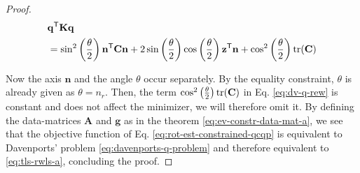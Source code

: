 \begin{proof}
	\begin{equation}
		\label{eq:dv-q-rew}
		\begin{aligned}
			&\mathbf{q}^{\mathsf{T}} \mathbf{K} \mathbf{q}\\
			&= \sin^2 \left(\frac{\theta}{2} \right) \mathbf{n}^{\mathsf{T}} \mathbf{C} \mathbf{n} + 2 \sin \left(\frac{\theta}{2} \right) \cos \left(\frac{\theta}{2} \right) \mathbf{z}^{\mathsf{T}} \mathbf{n} + \cos^2 \left(\frac{\theta}{2} \right) \textrm{tr}(\mathbf{C})
		\end{aligned}
	\end{equation}
	
	Now the axis $\mathbf{n}$ and the angle $\theta$ occur separately. 
	By the equality constraint, $\theta$ is already given as $\theta = n_r$. Then, the term $ \cos^2 \left(\frac{\theta}{2} \right) \textrm{tr}(\mathbf{C})$ in Eq. \ref{eq:dv-q-rew} is constant and does not affect the minimizer, we will therefore omit it. 
	 By defining the data-matrices $\mathbf{A}$ and $\mathbf{g}$ as in the theorem \ref{eq:ev-constr-data-mat-a}, we see that the objective function of Eq. \ref{eq:rot-est-constrained-qcqp} is equivalent to Davenports' problem \ref{eq:davenports-q-problem} and therefore equivalent to \ref{eq:tls-rwls-a}, concluding the proof.
\end{proof}	
